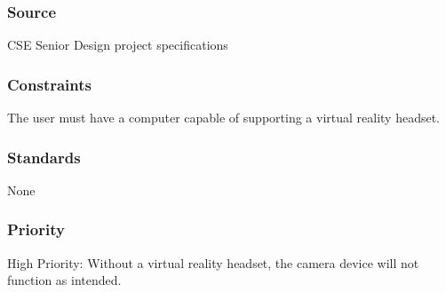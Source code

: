 \subsubsection{Source}
CSE Senior Design project specifications
\subsubsection{Constraints}
The user must have a computer capable of supporting a virtual reality headset.
\subsubsection{Standards}
None
\subsubsection{Priority}
High Priority: Without a virtual reality headset, the camera device will not function as intended.
